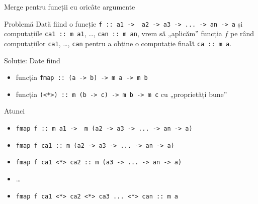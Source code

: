 \documentclass[xcolor=pdftex,romanian,colorlinks]{beamer}
\begin{document}
\begin{frame}{Merge pentru funcții cu oricâte argumente}
\begin{alertblock}{Problemă}
Dată fiind o funcție \lstinline$f :: a1 ->  a2 -> a3 -> ... -> an -> a$
și computațiile \lstinline$ca1 :: m a1$, \ldots, \lstinline$can :: m an$,
vrem să „aplicăm” funcția $f$ pe rând computațiilor \lstinline$ca1$,  \ldots, \lstinline$can$ pentru a obține o computație finală \lstinline$ca :: m a$.
\end{alertblock}
\vfill
\begin{block}{Soluție: {\color{black}
Date fiind }}
\begin{itemize}
\item funcția \lstinline$fmap :: (a -> b) -> m a -> m b$
\item funcția \lstinline$(<*>) :: m (b -> c) -> m b -> m c$ cu „proprietăți bune”
\end{itemize}
Atunci
\begin{minipage}[t]{.8\columnwidth}
\begin{itemize}
\item[] \lstinline$fmap f :: m a1 ->  m (a2 -> a3 -> ... -> an -> a)$
\item[] \lstinline$fmap f ca1 :: m (a2 -> a3 -> ... -> an -> a)$
\item[] \lstinline$fmap f ca1 <*> ca2 :: m (a3 -> ... -> an -> a)$
\item[] \dots
\item[] \lstinline$fmap f ca1 <*> ca2 <*> ca3 ... <*> can :: m a$
\end{itemize}
\end{minipage}
\end{block}

\end{frame}
\end{document}

